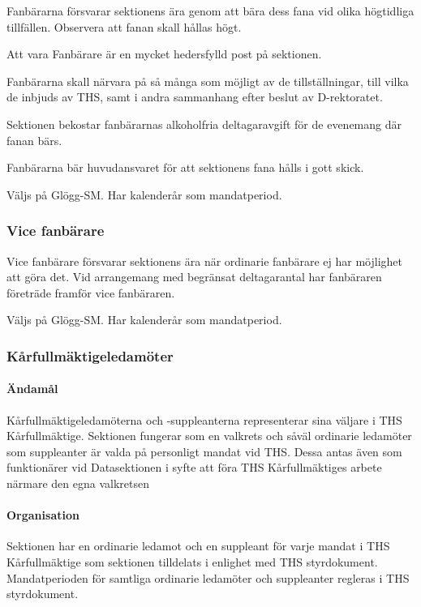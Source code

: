 \documentclass{dgovdoc}
\begin{document}
Fanbärarna försvarar sektionens ära genom att bära dess fana vid olika
högtidliga tillfällen. Observera att fanan skall hållas högt.

Att vara Fanbärare är en mycket hedersfylld post på sektionen.

Fanbärarna skall närvara på så många som möjligt av de tillställningar, till
vilka de inbjuds av THS, samt i andra sammanhang efter beslut av D-rektoratet.

Sektionen bekostar fanbärarnas alkoholfria deltagaravgift för de evenemang där
fanan bärs.

Fanbärarna bär huvudansvaret för att sektionens fana hålls i gott skick.

Väljs på Glögg-SM. Har kalenderår som mandatperiod.

\subsubsection{Vice fanbärare}

Vice fanbärare försvarar sektionens ära när ordinarie fanbärare ej har
möjlighet att göra det. Vid arrangemang med begränsat deltagarantal har
fanbäraren företräde framför vice fanbäraren.

Väljs på Glögg-SM. Har kalenderår som mandatperiod.

\subsubsection{Kårfullmäktigeledamöter}

\paragraph{Ändamål}

Kårfullmäktigeledamöterna och -suppleanterna representerar sina väljare i
THS Kårfullmäktige. Sektionen fungerar som en valkrets och såväl ordinarie ledamöter
som suppleanter är valda på personligt mandat vid THS. Dessa antas även som funktionärer
vid Datasektionen i syfte att föra THS Kårfullmäktiges arbete närmare den
egna valkretsen

\paragraph{Organisation}

Sektionen har en ordinarie ledamot och en suppleant för varje mandat i THS Kårfullmäktige
som sektionen tilldelats i enlighet med THS styrdokument. Mandatperioden för samtliga
ordinarie ledamöter och suppleanter regleras i THS styrdokument.
\end{document}
